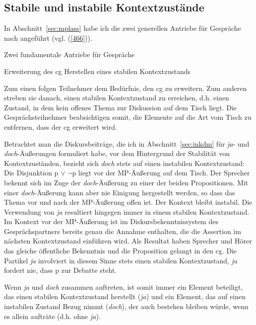 \subsection{Stabile und instabile Kontextzustände}
In Abschnitt~\ref{sec:mplass} habe ich die zwei generellen Antriebe für Gespräche nach \citet{Farkas2010} angeführt (vgl. (\ref{466})).

\begin{exe}
	\ex\label{466} Zwei fundamentale Antriebe für Gespräche
 		\begin{xlist}
			\ex\label{466a} Erweiterung des cg
 			\ex\label{466b}	Herstellen eines stabilen Kontextzustands
 		\end{xlist}			
\end{exe}
Zum einen folgen Teilnehmer dem Bedürfnis, den cg zu erweitern. Zum anderen streben sie danach, einen stabilen Kontextzustand zu erreichen, d.h. einen Zustand, in dem kein offenes Thema zur Diskussion auf dem Tisch liegt. Die Gesprächsteilnehmer beabsichtigen somit, die Elemente auf die Art vom Tisch zu entfernen, dass der cg erweitert wird. 

Betrachtet man die Diskursbeiträge, die ich in Abschnitt~\ref{sec:inkdm} für \textit{ja}- und \textit{doch}-Äußerungen formuliert habe, vor dem Hintergrund der Stabilität von Kontextzuständen, bezieht sich \textit{doch} stets auf einen instabilen Kontextzu\-stand: Die Disjunktion p $\vee$ $\neg$p liegt vor der MP-Äußerung auf dem Tisch. Der Sprecher bekennt sich im Zuge der \textit{doch}-Äußerung zu einer der beiden Propositionen. Mit einer \textit{doch}-Äußerung kann aber nie Einigung hergestellt werden, so dass das Thema vor und nach der MP-Äußerung offen ist. Der Kontext bleibt instabil. Die Verwendung von \textit{ja} resultiert hingegen immer in einem stabilen Kontextzustand. Im Kontext vor der MP-Äußerung ist im Diskursbekenntnissystem des Gesprächspartners bereits genau die Annahme enthalten, die die Assertion im nächsten Kontextzustand einführen wird. Als Resultat haben Sprecher und Hörer das gleiche öffentliche Bekenntnis und die Proposition gelangt in den cg. Die Partikel \textit{ja} involviert in diesem Sinne stets einen stabilen Kontextzustand, \textit{ja} fordert nie, dass p zur Debatte steht. 

Wenn \textit{ja} und \textit{doch} zusammen auftreten, ist somit immer ein Element beteiligt, das einen stabilen Kontextzustand herstellt (\textit{ja}) und ein Element, das auf einen instabilen Zu\-stand Bezug nimmt (\textit{doch}), der auch bestehen bleiben würde, wenn es allein aufträte (d.h. ohne \textit{ja}).


